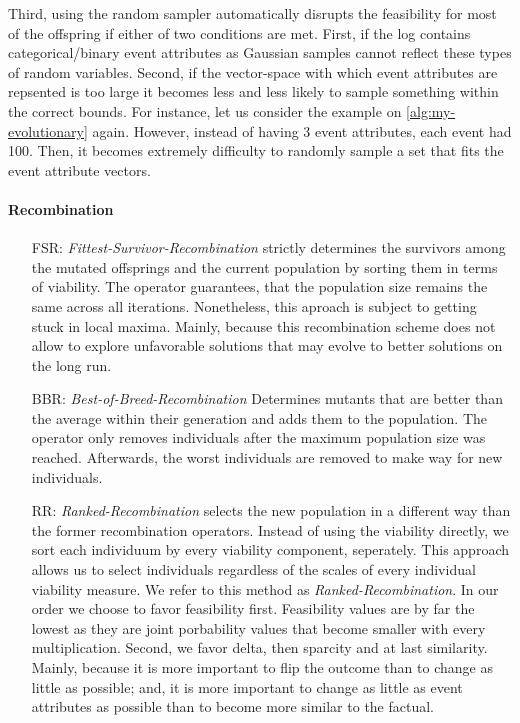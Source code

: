 \documentclass[./../../paper.tex]{subfiles}
\begin{document}
Third, using the random sampler automatically disrupts the feasibility for most of the offspring if either of two conditions are met. First, if the log contains categorical/binary event attributes as Gaussian samples cannot reflect these types of random variables. Second, if the vector-space with which event attributes are repsented is too large it becomes less and less likely to sample something within the correct bounds.
For instance, let us consider the example on \autoref{alg:my-evolutionary} again.
However, instead of having 3 event attributes, each event had 100. Then, it becomes extremely difficulty to randomly sample a set that fits the event attribute vectors.

\paragraph{Recombination}
\begin{enumerate}
    \item[FSR:] \emph{Fittest-Survivor-Recombination} strictly determines the survivors among the mutated offsprings and the current population by sorting them in terms of viability.
    The operator guarantees, that the population size remains the same across all iterations.
    Nonetheless, this aproach is subject to getting stuck in local maxima. Mainly, because this recombination scheme does not allow to explore unfavorable solutions that may evolve to better solutions on the long run.
    \item[BBR:] \emph{Best-of-Breed-Recombination} Determines mutants that are better than the average within their generation and adds them to the population. The operator only removes individuals after the maximum population size was reached. Afterwards, the worst individuals are removed to make way for new individuals.
    \item[RR:] \emph{Ranked-Recombination} selects the new population in a different way than the former recombination operators. Instead of using the viability directly, we sort each individuum by every viability component, seperately. This approach allows us to select individuals regardless of the scales of every individual viability measure. We refer to this method as \emph{Ranked-Recombination}. In our order we choose to favor feasibility first. Feasibility values are by far the lowest as they are joint porbability values that become smaller with every multiplication. Second, we favor delta, then sparcity and at last similarity. Mainly, because it is more important to flip the outcome than to change as little as possible; and, it is more important to change as little as event attributes as possible than to become more similar to the factual.
\end{enumerate}
\end{document}
